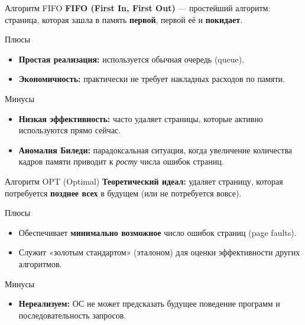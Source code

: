 \documentclass[10pt,pdf,hyperref={unicode}]{beamer}
\begin{document}
\begin{frame}{Алгоритм FIFO}
    \textbf{FIFO (First In, First Out)} — простейший алгоритм: страница, которая зашла в память \textbf{первой}, первой её и \textbf{покидает}.

    \vspace{0.3cm}

    \begin{block}{Плюсы}
        \begin{itemize}
            \item \textbf{Простая реализация:} используется обычная очередь (queue).
            \item \textbf{Экономичность:} практически не требует накладных расходов по памяти.
        \end{itemize}
    \end{block}

    \begin{alertblock}{Минусы}
        \begin{itemize}
            \item \textbf{Низкая эффективность:} часто удаляет страницы, которые активно используются прямо сейчас.
            \item \textbf{Аномалия Биледи:} парадоксальная ситуация, когда увеличение количества кадров памяти приводит к \textit{росту} числа ошибок страниц.
        \end{itemize}
    \end{alertblock}
\end{frame}

\begin{frame}{Алгоритм OPT (Optimal)}
    \textbf{Теоретический идеал:} удаляет страницу, которая потребуется \textbf{позднее всех} в будущем (или не потребуется вовсе).

    \begin{block}{Плюсы}
        \begin{itemize}
            \item Обеспечивает \textbf{минимально возможное} число ошибок страниц (page faults).
            \item Служит «золотым стандартом» (эталоном) для оценки эффективности других алгоритмов.
        \end{itemize}
    \end{block}

    \begin{alertblock}{Минусы}
        \begin{itemize}
            \item \textbf{Нереализуем:} ОС не может предсказать будущее поведение программ и последовательность запросов.
        \end{itemize}
    \end{alertblock}
\end{frame}
\end{document}

